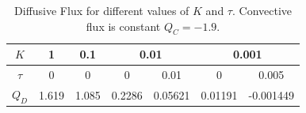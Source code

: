 \documentclass[hidelinks]{article}
\begin{document}
\begin{table}[H]
    \centering
    \begin{tabular}{c|c|c|c|c|c|c}
  $K$ & 1 & 0.1 & \multicolumn{2}{c|}{0.01} & \multicolumn{2}{c}{0.001} \\
  \hline
  $\tau$    & 0& 0 & 0 & 0.01 & 0 & 0.005 \\
  \hline
  $Q_D$  & 1.619 & 1.085 & 0.2286 & 0.05621 & 0.01191 & -0.001449 \\
\end{tabular}
\caption{Diffusive Flux for different values of $K$ and $\tau$. Convective flux is constant $Q_C=-1.9$.}\label{tab:diffflux}
\end{table}
\end{document}
